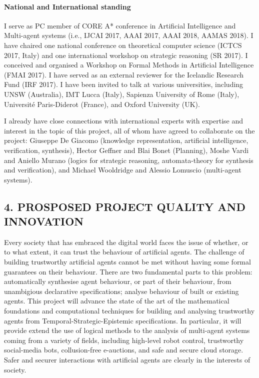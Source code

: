 \documentclass[a4paper,12pt]{scrartcl}
\def\TSE{Temporal-Strategic-Epistemic\xspace}
\begin{document}
\paragraph{National and International standing}



I serve as PC member of CORE A* conference in Artificial Intelligence and Multi-agent systems (i.e., IJCAI 2017, AAAI 2017, AAAI 2018, AAMAS 2018). I have chaired one national conference on theoretical computer science (ICTCS 2017, Italy) and one international workshop on strategic reasoning (SR 2017). I conceived and organised a Workshop on Formal Methods in Artificial Intelligence (FMAI 2017). 
I have served as an external reviewer for the Icelandic Research Fund (IRF 2017). I have been invited to talk at various universities, including UNSW (Australia), IMT Lucca (Italy), Sapienza University of Rome (Italy), Universit\'e Paris-Diderot (France), and Oxford University (UK).

I already have close connections with international experts with expertise and interest in the topic of this project, all of whom have agreed to collaborate on the project: Giuseppe De Giacomo (knowledge representation, artificial intelligence, verification, synthesis), Hector Geffner and Blai Bonet (Planning), Moshe Vardi and Aniello Murano (logics for strategic reasoning, automata-theory for synthesis and verification), and Michael Wooldridge and Alessio Lomuscio (multi-agent systems).



\subsection*{4. PROSPOSED PROJECT QUALITY AND INNOVATION}

Every society that has embraced the digital world faces the issue of whether, or to what extent, it can trust the behaviour 
of artificial agents. The challenge of building trustworthy artificial agents cannot be met without having some formal guarantees on their 
behaviour. There are two fundamental parts to this problem: automatically synthesise agent behaviour, or part of their behaviour, from unambigious declarative 
specifications; analyse behaviour of built or existing agents. This project will advance the state of the art of the mathematical foundations and computational techniques 
for building and analysing trustworthy agents from \TSE specifications. In particular, it will provide extend the use of logical methods to the analysis of multi-agent systems coming 
from a variety of fields, including high-level robot control, trustworthy social-media bots, collusion-free e-auctions, and safe and secure cloud storage. 
Safer and securer interactions with artificial agents are clearly in the interests of society. 
\end{document}
